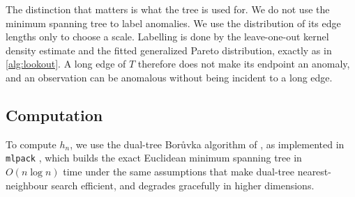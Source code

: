 The distinction that matters is what the tree is used for. We do not use the minimum spanning tree to label anomalies. We use the distribution of its edge lengths only to choose a scale. Labelling is done by the leave-one-out kernel density estimate and the fitted generalized Pareto distribution, exactly as in \cref{alg:lookout}. A long edge of $T$ therefore does not make its endpoint an anomaly, and an observation can be anomalous without being incident to a long edge.

\subsection{Computation}\label{sec:computation}

To compute $h_n$, we use the dual-tree Bor\r{u}vka algorithm of \citet{March2010}, as implemented in \texttt{mlpack} \citep{mlpackR}, which builds the exact Euclidean minimum spanning tree in $O(n\log n)$ time under the same assumptions that make dual-tree nearest-neighbour search efficient, and degrades gracefully in higher dimensions.

